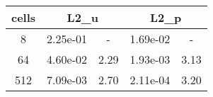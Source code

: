 \documentclass[10pt]{report}
\begin{document}
\begin{table}[H]
\begin{center}
\begin{tabular}{|c|c|c|c|c|} \hline
cells & 
\multicolumn{2}{|c|}{L2_u} & 
\multicolumn{2}{|c|}{L2_p}\\ \hline
8 & 2.25e-01 & - & 1.69e-02 & -\\ \hline
64 & 4.60e-02 & 2.29 & 1.93e-03 & 3.13\\ \hline
512 & 7.09e-03 & 2.70 & 2.11e-04 & 3.20\\ \hline
\end{tabular}
\end{center}
\end{table}
\end{document}
